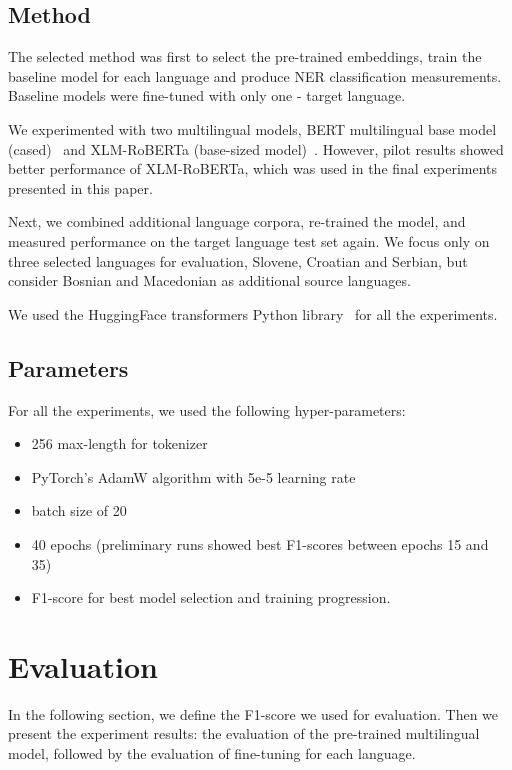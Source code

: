 \documentclass[11pt]{article}
\begin{document}
\subsection{Method}
\label{subsec:method}
The selected method was first to select the pre-trained embeddings, train the baseline model for each language and produce NER classification measurements.
Baseline models were fine-tuned with only one - target language.

We experimented with two multilingual models, BERT multilingual base model (cased)~\cite{DBLP:journals/corr/abs-1810-04805} and XLM-RoBERTa (base-sized model)~\cite{DBLP:journals/corr/abs-1911-02116}.
However, pilot results showed better performance of XLM-RoBERTa, which was used in the final experiments presented in this paper.

Next, we combined additional language corpora, re-trained the model, and measured performance on the target language test set again.
We focus only on three selected languages for evaluation, Slovene, Croatian and Serbian, but consider Bosnian and Macedonian as additional source languages.

We used the HuggingFace transformers Python library~\cite{wolf-etal-2020-transformers} for all the experiments.

\subsection{Parameters}
\label{subsec:parameters}
For all the experiments, we used the following hyper-parameters:
\begin{itemize}
  \item 256 max-length for tokenizer
  \item PyTorch's AdamW algorithm with 5e-5 learning rate
  \item batch size of 20
  \item 40 epochs (preliminary runs showed  best F1-scores between epochs 15 and 35)
  \item F1-score for best model selection and training progression.
\end{itemize}

\section{Evaluation}
\label{sec:evaluation}
In the following section, we define the F1-score we used for evaluation. 
Then we present the experiment results: the evaluation of the pre-trained multilingual model, followed by the evaluation of fine-tuning for each language.
\end{document}
